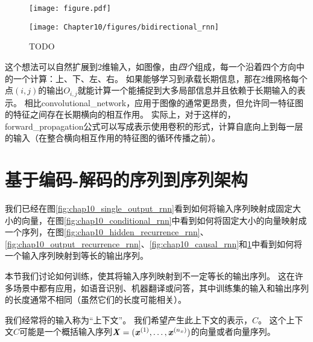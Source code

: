 
\begin{figure}[!htb]
\ifOpenSource
\centerline{\texttt{[image: figure.pdf]}}
\else
\centerline{\texttt{[image: Chapter10/figures/bidirectional\_rnn]}}
\fi
\caption{TODO}
\label{fig:chap10_bidirectional_rnn}
\end{figure}

这个想法可以自然扩展到2维输入，如图像，由\emph{四个}组成，每一个沿着四个方向中的一个计算：上、下、左、右。
如果能够学习到承载长期信息，那在2维网格每个点$(i, j)$的输出$O_{i,j}$就能计算一个能捕捉到大多局部信息并且依赖于长期输入的表示。
相比\gls{convolutional_network}，应用于图像的通常更昂贵，但允许同一特征图的特征之间存在长期横向的相互作用\citep{Visin-et-al-arxiv2015-renet,kalchbrenner2015grid}。
实际上，对于这样的，\gls{forward_propagation}公式可以写成表示使用卷积的形式，计算自底向上到每一层的输入（在整合横向相互作用的特征图的循环传播之前）。


\section{基于编码-解码的序列到序列架构}
\label{sec:encoder_decoder_sequence_to_sequence_architectures}
我们已经在图\ref{fig:chap10_single_output_rnn}看到如何将输入序列映射成固定大小的向量，在图\ref{fig:chap10_conditional_rnn}中看到如何将固定大小的向量映射成一个序列，在图\ref{fig:chap10_hidden_recurrence_rnn}、\ref{fig:chap10_output_recurrence_rnn}、\ref{fig:chap10_causal_rnn}和\ref{fig:chap10_bidirectional_rnn}中看到如何将一个输入序列映射到等长的输出序列。

本节我们讨论如何训练，使其将输入序列映射到不一定等长的输出序列。
这在许多场景中都有应用，如语音识别、机器翻译或问答，其中训练集的输入和输出序列的长度通常不相同（虽然它们的长度可能相关）。

我们经常将的输入称为``上下文''。
我们希望产生此上下文的表示，$C$。
这个上下文$C$可能是一个概括输入序列$\boldsymbol{\mathit{X}}=(\boldsymbol{\mathit{x}}^{(1)},\dots,\boldsymbol{\mathit{x}}^{(n_x)})$的向量或者向量序列。

